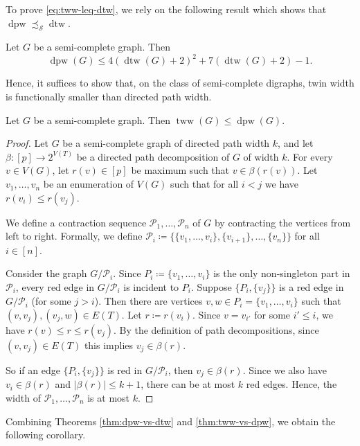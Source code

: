 \documentclass{theoretics}
\newcommand{\CP}{{\mathcal P}}
\newcommand{\CS}{{\mathcal S}}
\DeclareMathOperator{\dtw}{dtw}
\DeclareMathOperator{\tww}{tww}
\DeclareMathOperator{\dpw}{dpw}
\begin{document}
To prove \eqref{eq:tww-leq-dtw}, we rely on the following result which shows that $\dpw\precsim_{\CS}\dtw$.

\begin{theorem}
 \label{thm:dpw-vs-dtw}
 Let $G$ be a semi-complete graph.
 Then
 \[\dpw(G) \leq 4(\dtw(G) + 2)^2 + 7(\dtw(G) + 2) - 1.\]
\end{theorem}

Hence, it suffices to show that, on the class of semi-complete digraphs, twin width is functionally smaller than directed path width.

\begin{theorem}
 \label{thm:tww-vs-dpw}
 Let $G$ be a semi-complete graph.
 Then $\tww(G) \leq \dpw(G)$.
\end{theorem}

\begin{proof}
 Let $G$ be a semi-complete graph of directed path width $k$, and let $\beta\colon [p] \to 2^{V(T)}$ be a directed path decomposition of $G$ of width $k$.
 For every $v \in V(G)$, let $r(v) \in [p]$ be maximum such that $v \in \beta(r(v))$.
 Let $v_1,\dots,v_n$ be an enumeration of $V(G)$ such that for all $i < j$ we have $r(v_i) \leq r(v_j)$.

 We define a contraction sequence $\CP_1,\dots,\CP_n$ of $G$ by contracting the vertices from left to right.
 Formally, we define $\CP_i \coloneqq \{\{v_1,\dots,v_i\},\{v_{i+1}\},\dots,\{v_n\}\}$ for all $i \in [n]$.

 Consider the graph $G/\CP_i$.
 Since $P_i \coloneqq \{v_1,\dots,v_i\}$ is the only non-singleton part in $\CP_i$, every red edge in $G/\CP_i$ is incident to $P_i$.
 Suppose $\{P_i,\{v_j\}\}$ is a red edge in $G/\CP_i$ (for some $j > i$).
 Then there are vertices $v,w \in P_i = \{v_1,\dots,v_i\}$ such that $(v,v_j),(v_j,w) \in E(T)$.
 Let $r\coloneqq r(v_i)$.
 Since $v = v_{i'}$ for some $i'\leq i$, we have $r(v) \leq r \leq r(v_j)$.
 By the definition of path decompositions, since $(v,v_j) \in E(T)$ this implies $v_j \in \beta(r)$.

 So if an edge $\{P_i,\{v_j\}\}$ is red in $G/\CP_i$, then $v_j \in \beta(r)$.
 Since we also have $v_i \in \beta(r)$ and $|\beta(r)| \leq k+1$, there can be at most $k$ red edges.
 Hence, the width of $\CP_1,\dots,\CP_n$ is at most $k$.
\end{proof}

Combining Theorems \ref{thm:dpw-vs-dtw} and \ref{thm:tww-vs-dpw}, we obtain the following corollary.
\end{document}
